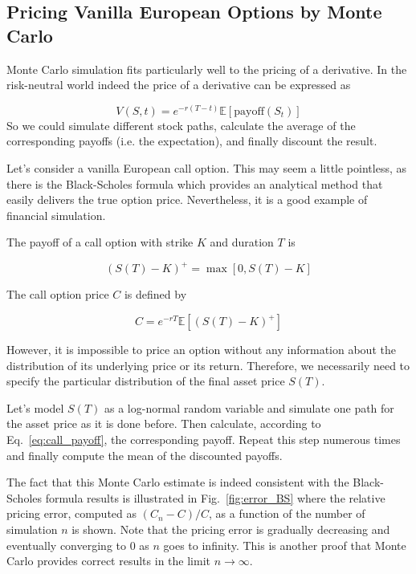\subsection{Pricing Vanilla European Options by Monte Carlo}
Monte Carlo simulation fits particularly well to the pricing of a derivative. In the risk-neutral world indeed the price of a derivative can be expressed as

\begin{equation}
V(S, t) = e^{-r(T-t)} \mathbb{E}[\textrm{payoff}(S_t)]
\end{equation}
So we could simulate different stock paths, calculate the average of the corresponding payoffs (i.e. the expectation), and finally discount the result.

Let's consider a vanilla European call option. This may seem a little pointless, as there is the Black-Scholes formula which provides an analytical method that easily delivers the true option price. Nevertheless, it is a good example of financial simulation. 

The payoff of a call option with strike $K$ and duration $T$ is 

\begin{equation}
(S(T)-K)^+ = \max[0,S(T)-K]
\end{equation}

The call option price $C$ is defined by

\begin{equation} 
C = e^{-rT} \mathbb{E}[(S(T)-K)^+ ]
\label{eq:call_payoff}
\end{equation}

However, it is impossible to price an option without any information about the distribution of its underlying price or its return. Therefore, we necessarily need to specify the particular distribution of the final asset price $S(T)$. 

Let's model $S(T)$ as a log-normal random variable and simulate one path for the asset price as it is done before. Then calculate, according to Eq.~\ref{eq:call_payoff}, the corresponding payoff. Repeat this step numerous times and finally compute the mean of the discounted payoffs. 

The fact that this Monte Carlo estimate is indeed consistent with the Black-Scholes formula results is illustrated in Fig.~\ref{fig:error_BS} where the relative pricing error, computed as $(C_n-C)/C$, as a function of the number of simulation $n$ is shown. Note that the pricing error is gradually decreasing and eventually converging to 0 as $n$ goes to infinity. This is another proof that Monte Carlo provides correct results in the limit $n\rightarrow\infty$.

